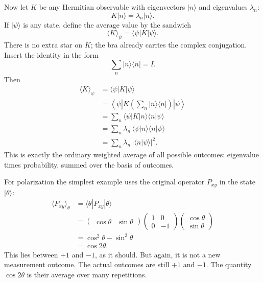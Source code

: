 Now let \(K\) be any Hermitian observable with eigenvectors \(|n\rangle\) and eigenvalues \(\lambda_n\):
\begin{equation}
K|n\rangle=\lambda_n|n\rangle.
\end{equation}
If \(|\psi\rangle\) is any state, define the average value by the sandwich
\begin{equation}
\langle K\rangle_\psi=\langle\psi|K|\psi\rangle.
\end{equation}
There is no extra star on \(K\); the bra already carries the complex conjugation. Insert the identity in the form
\begin{equation}
\sum_n |n\rangle\langle n|=I.
\end{equation}
Then
\begin{align}
\langle K\rangle_\psi
&=
\langle\psi|K|\psi\rangle \\
&=
\left\langle\psi\left|K\left(\sum_n |n\rangle\langle n|\right)\right|\psi\right\rangle \\
&=
\sum_n \langle\psi|K|n\rangle\langle n|\psi\rangle \\
&=
\sum_n \lambda_n\,\langle\psi|n\rangle\langle n|\psi\rangle \\
&=
\sum_n \lambda_n\,|\langle n|\psi\rangle|^2.
\end{align}
This is exactly the ordinary weighted average of all possible outcomes: eigenvalue times probability, summed over the basis of outcomes.

For polarization the simplest example uses the original operator \(P_{xy}\) in the state \(|\theta\rangle\):
\begin{align}
\langle P_{xy}\rangle_\theta
&=
\langle\theta|P_{xy}|\theta\rangle \\
&=
\begin{pmatrix}
\cos\theta & \sin\theta
\end{pmatrix}
\begin{pmatrix}
1&0\\
0&-1
\end{pmatrix}
\begin{pmatrix}
\cos\theta\\
\sin\theta
\end{pmatrix} \\
&=
\cos^2\theta-\sin^2\theta \\
&=
\cos 2\theta.
\end{align}
This lies between \(+1\) and \(-1\), as it should. But again, it is not a new measurement outcome. The actual outcomes are still \(+1\) and \(-1\). The quantity \(\cos 2\theta\) is their average over many repetitions.

